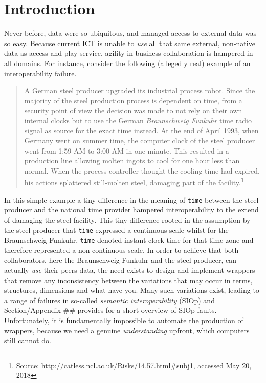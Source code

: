 \documentclass[a4paper,11pt,oneside,oldfontcommands]{memoir}
\theoremstyle{definition}
\theoremstyle{break}		%
\numberwithin{equation}{chapter}
\numberwithin{figure}{chapter}
\begin{document}



%





\hypertarget{introduction}{%
\chapter{Introduction}\label{introduction}}

Never before, data were so ubiquitous, and managed access to external
data was so easy. Because current ICT is unable to \emph{use} all that
same external, non-native data as access-and-play service, agility in
business collaboration is hampered in all domains. For instance,
consider the following (allegedly real) example of an interoperability
failure.

\begin{quote}
A German steel producer upgraded its industrial process robot. Since the
majority of the steel production process is dependent on time, from a
security point of view the decision was made to not rely on their own
internal clocks but to use the German \emph{Braunschweig Funkuhr} time
radio signal as source for the exact time instead. At the end of April
1993, when Germany went on summer time, the computer clock of the steel
producer went from 1:59 AM to 3:00 AM in one minute. This resulted in a
production line allowing molten ingots to cool for one hour less than
normal. When the process controller thought the cooling time had
expired, his actions splattered still-molten steel, damaging part of the
facility.\footnote{Source:
  http://catless.ncl.ac.uk/Risks/14.57.html\#subj1, accessed May 20,
  2018}
\end{quote}

In this simple example a tiny difference in the meaning of \texttt{time}
between the steel producer and the national time provider hampered
interoperability to the extend of damaging the steel facility. This tiny
difference rooted in the assumption by the steel producer that
\texttt{time} expressed a continuous scale whilst for the Braunschweig
Funkuhr, \texttt{time} denoted instant clock time for that time zone and
therefore represented a non-continuous scale. In order to achieve that
both collaborators, here the Braunschweig Funkuhr and the steel
producer, can actually \emph{use} their peers data, the need exists to
design and implement wrappers that remove any inconsistency between the
variations that may occur in terms, structures, dimensions and what have
you. Many such variations exist, leading to a range of failures in
so-called \emph{semantic interoperability} (SIOp) and Section/Appendix
\#\# provides for a short overview of SIOp-faults. Unfortunately, it is
fundamentally impossible to automate the production of wrappers, because
we need a genuine \emph{understanding} upfront, which computers still
cannot do.
\end{document}

